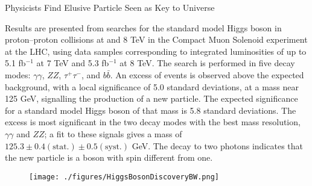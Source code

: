 \begin{MyArticle}[enhanced, tikz={rotate=0}, width=1.0\textwidth]{Physicists Find Elusive Particle Seen as Key to Universe}
  \begin{multicols}{2}
    Results are presented from searches for the standard model Higgs
    boson in proton–proton collisions at and 8 TeV in the Compact Muon
    Solenoid experiment at the LHC, using data samples corresponding
    to integrated luminosities of up to 5.1 fb$^{−1}$ at 7 TeV and 5.3 fb$^{−1}$
    at 8 TeV. The search is performed in five decay modes:
    $\gamma\gamma$, $ZZ$,  $\tau^{+}\tau^{-}$, and $b\bar{b}$.
    An excess of events is observed above the expected background,
    with a local significance of 5.0 standard deviations, at a mass
    near 125 GeV, signalling the production of a new particle. The
    expected significance for a standard model Higgs boson of that
    mass is 5.8 standard deviations. The excess is most significant in
    the two decay modes with the best mass resolution, $\gamma\gamma$ and $ZZ$; a
    fit to these signals gives a mass of 
    $125.3\pm0.4(\text{stat.})\pm0.5(\text{syst.})$ GeV. The decay to
    two photons indicates that the new particle is a boson with spin 
    different from one. 
    \begin{figure}
      \begin{center}
        \vspace{-0.2in}
        \leavevmode
        \texttt{[image: ./figures/HiggsBosonDiscoveryBW.png]}
      \end{center}
    \end{figure}
  \end{multicols}
\end{MyArticle}
